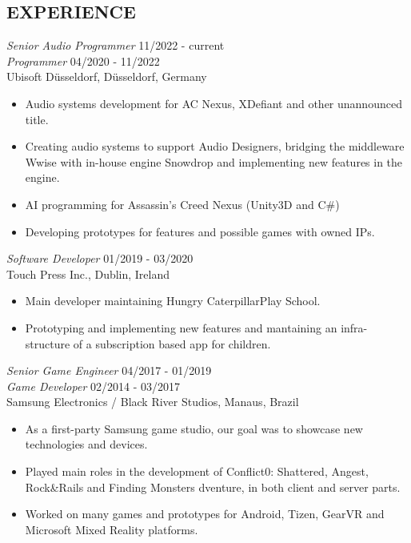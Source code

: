 \documentclass[line,margin]{res}
\begin{document}
\begin{resume}
\section{EXPERIENCE} 
        {\sl Senior Audio Programmer} \hfill 11/2022 - current \\
        {\sl Programmer} \hfill 04/2020 - 11/2022 \\
                Ubisoft Düsseldorf, Düsseldorf, Germany
        \begin{itemize}  \itemsep 1.25pt
            \item Audio systems development for AC Nexus, XDefiant and other unannounced title.
            \item Creating audio systems to support Audio Designers, bridging the middleware Wwise with in-house engine Snowdrop and implementing new features in the engine.
            \item AI programming for Assassin's Creed Nexus (Unity3D and C\#)
            \item Developing prototypes for features and possible games with owned IPs.
        \end{itemize}

        {\sl Software Developer} \hfill 01/2019 - 03/2020 \\
		Touch Press Inc., Dublin, Ireland
        \begin{itemize}  \itemsep 1.25pt
            \item Main developer maintaining Hungry Caterpillar\texttrademark  Play School.
            \item Prototyping and implementing new features and mantaining an infra-structure of a subscription based app for children. 
        \end{itemize}

        {\sl Senior Game Engineer} \hfill 04/2017 - 01/2019 \\
        {\sl Game Developer} \hfill 02/2014 - 03/2017 \\
                Samsung Electronics / Black River Studios, Manaus, Brazil
        \begin{itemize}  \itemsep 1.25pt
            \item As a first-party Samsung game studio, our goal was to showcase new technologies and devices.
            \item Played main roles in the development of Conflict0: Shattered, Angest, Rock\&Rails and Finding Monsters dventure, in both client and server parts.
            \item Worked on many games and prototypes for Android, Tizen, GearVR and Microsoft Mixed Reality platforms.
        \end{itemize}
                 

\end{resume}
\end{document}
